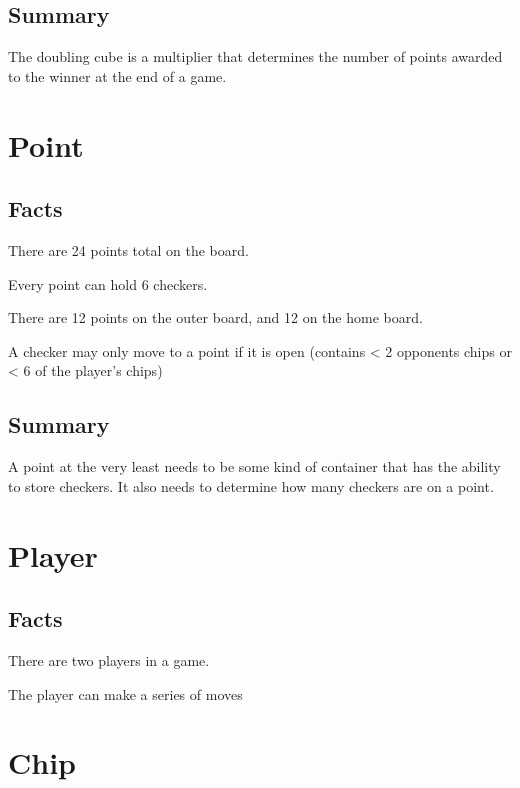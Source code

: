 \documentclass{report}
\begin{document}
\subsection{Summary}
The doubling cube is a multiplier that determines the number of points awarded
to the winner at the end of a game.

\section{Point}

\subsection{Facts}

\begin{dashed}
    \item There are 24 points total on the board.
    \item Every point can hold 6 checkers.
    \item There are 12 points on the outer board, and 12 on the home board.
    \item A checker may only move to a point if it is open (contains < 2 opponents chips
        or < 6 of the player's chips)
\end{dashed}

\subsection{Summary}

A point at the very least needs to be some kind of container that has the ability
to store checkers. It also needs to determine how many checkers are on a point.

\section{Player}

\subsection{Facts}

\begin{dashed}
    \item There are two players in a game.
    \item The player can make a series of moves
\end{dashed}

\section{Chip}
\end{document}
